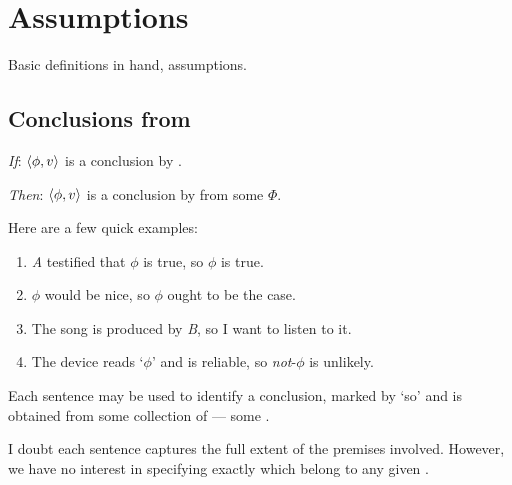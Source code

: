 \section{Assumptions}
\label{sec:assumptions}

\begin{note}
  Basic definitions in hand, assumptions.
\end{note}

\subsection{Conclusions from }
\label{sec:pools-premises}

\begin{note}
  \begin{assumption}
    \label{assu:concluding:pools}
    \vspace{-\baselineskip}
    \begin{itenum}
    \item[\emph{If}:]
      \(\langle\phi, v\rangle\) is a conclusion by \vAgent{}.
    \item[\emph{Then}:]
      \(\langle\phi, v\rangle\) is a conclusion by \vAgent{} from some \pool{} \(\Phi\).
    \end{itenum}
    \vspace{-\baselineskip}
  \end{assumption}

  \noindent%
  Here are a few quick examples:
  \begin{enumerate}[label=\arabic*., ref=(\arabic*), noitemsep]
  \item
    \emph{A} testified that \(\phi\) is true, so \(\phi\) is true.
  \item
    \(\phi\) would be nice, so \(\phi\) ought to be the case.
  \item
    The song is produced by \emph{B}, so I want to listen to it.
  \item
    The device reads `\(\phi\)' and is reliable, so \emph{not}-\(\phi\) is unlikely.
  \end{enumerate}
  Each sentence may be used to identify a conclusion, marked by `so' and is obtained from some collection of  --- some \pool{}.

  I doubt each sentence captures the full extent of the premises involved.
  However, we have no interest in specifying exactly which \evalN{} belong to any given \pool{}.
\end{note}

